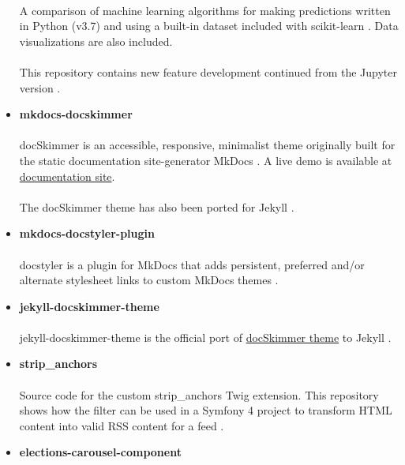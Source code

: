 \documentclass[11pt]{article}
\begin{document}
\begin{itemize}
\paragraph{}
A comparison of machine learning algorithms for making predictions written in Python (v3.7) and using a built-in dataset included with scikit-learn \cite{machinelearning}. Data visualizations are also included.
 \paragraph{}
This repository contains new feature development continued from the Jupyter version \cite{jupyter}.
\item \textbf{mkdocs-docskimmer}
\paragraph{}
docSkimmer is an accessible, responsive, minimalist theme originally built for the static documentation site-generator MkDocs \cite{mkdocs-docskimmer}. A live demo is available at \href{http://bitsof.bytesofdesign.com/mkdocs-docskimmer/}{documentation site}.
\paragraph{}
The docSkimmer theme has also been ported for Jekyll \cite{jekyll-docskimmer}.
\item \textbf{mkdocs-docstyler-plugin}
\paragraph{}
docstyler is a plugin for MkDocs that adds persistent, preferred
and/or alternate stylesheet links to custom MkDocs themes \cite{mkdocs-docstyler-plugin}.
\item \textbf{jekyll-docskimmer-theme}
 \paragraph{}
jekyll-docskimmer-theme is the official port of \href{https://github.com/hfagerlund/mkdocs-docskimmer}{docSkimmer theme} to Jekyll \cite{jekyll-docskimmer}.
\item \textbf{strip\_anchors}
\paragraph{}
Source code for the custom strip\_anchors Twig extension. This repository shows how the filter can be used in a Symfony 4 project to transform HTML content into valid RSS content for a feed \cite{stripanchors}.
\item \textbf{elections-carousel-component}

\end{itemize}
\end{document}
